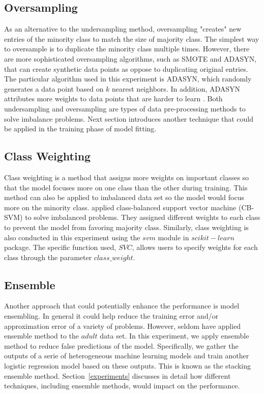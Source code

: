 \documentclass{article}
\begin{document}
\subsection{Oversampling}
\label{oversampling}

As an alternative to the undersampling method, oversampling "creates" new entries of the minority class to match the size of majority class. The simplest way to oversample is to duplicate the minority class multiple times. However, there are more sophisticated oversampling algorithms, such as SMOTE and ADASYN, that can create synthetic data points as oppose to duplicating original entries. The particular algorithm used in this experiment is ADASYN, which randomly generates a data point based on $k$ nearest neighbors. In addition, ADASYN attributes more weights to data points that are harder to learn \citep{ADASYN}. Both undersampling and oversampling are types of data pre-processing methods to solve imbalance problems. Next section introduces another technique that could be applied in the training phase of model fitting.

\subsection{Class Weighting}
\label{class_weighting}

Class weighting is a method that assigns more weights on important classes so that the model focuses more on one class than the other during training. This method can also be applied to imbalanced data set so the model would focus more on the minority class. \citet{CBSVM} applied class-balanced support vector machine (CB-SVM) to solve imbalanced problems. They assigned different weights to each class to prevent the model from favoring majority class. Similarly, class weighting is also conducted in this experiment using the $svm$ module in $scikit-learn$ package. The specific function used, $SVC$, allows users to specify weights for each class through the parameter $class\_weight$.

\subsection{Ensemble}
\label{ensemble}

Another approach that could potentially enhance the performance is model ensembling. In general it could help reduce the training error and/or approximation error of a variety of problems. However, seldom have applied ensemble method to the $adult$ data set. In this experiment, we apply ensemble method to reduce false predictions of the model. Specifically, we gather the outputs of a serie of heterogeneous machine learning models and train another logistic regression model based on these outputs. This is known as the stacking ensemble method. Section~\ref{experiments} discusses in detail how different techniques, including ensemble methods, would impact on the performance.
\end{document}
